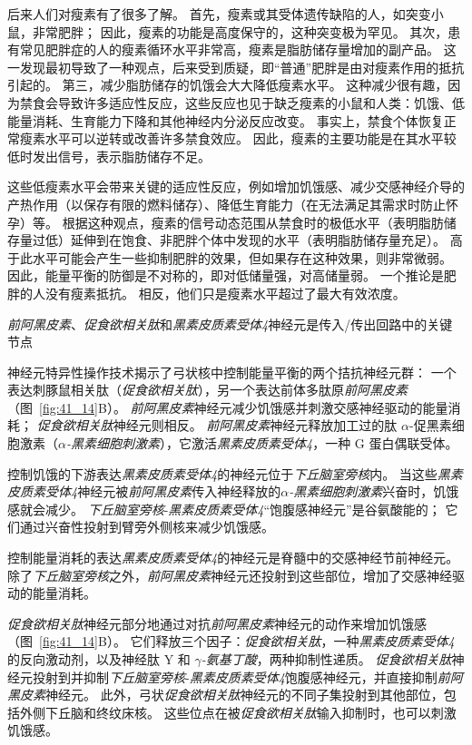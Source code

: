 后来人们对瘦素有了很多了解。
首先，瘦素或其受体遗传缺陷的人，如突变小鼠，非常肥胖；
因此，瘦素的功能是高度保守的，这种突变极为罕见。
其次，患有常见肥胖症的人的瘦素循环水平非常高，瘦素是脂肪储存量增加的副产品。
这一发现最初导致了一种观点，后来受到质疑，即“普通”肥胖是由对瘦素作用的抵抗引起的。
第三，减少脂肪储存的饥饿会大大降低瘦素水平。
这种减少很有趣，因为禁食会导致许多适应性反应，这些反应也见于缺乏瘦素的小鼠和人类：饥饿、低能量消耗、生育能力下降和其他神经内分泌反应改变。
事实上，禁食个体恢复正常瘦素水平可以逆转或改善许多禁食效应。
因此，瘦素的主要功能是在其水平较低时发出信号，表示脂肪储存不足。


这些低瘦素水平会带来关键的适应性反应，例如增加饥饿感、减少交感神经介导的产热作用（以保存有限的燃料储存）、降低生育能力（在无法满足其需求时防止怀孕）等。
根据这种观点，瘦素的信号动态范围从禁食时的极低水平（表明脂肪储存量过低）延伸到在饱食、非肥胖个体中发现的水平（表明脂肪储存量充足）。
高于此水平可能会产生一些抑制肥胖的效果，但如果存在这种效果，则非常微弱。
因此，能量平衡的防御是不对称的，即对低储量强，对高储量弱。
一个推论是肥胖的人没有瘦素抵抗。
相反，他们只是瘦素水平超过了最大有效浓度。


\textit{前阿黑皮素}、\textit{促食欲相关肽}和\textit{黑素皮质素受体4}神经元是传入/传出回路中的关键节点

神经元特异性操作技术揭示了弓状核中控制能量平衡的两个拮抗神经元群：
一个表达刺豚鼠相关肽（\textit{促食欲相关肽}），另一个表达前体多肽原\textit{前阿黑皮素}（图~\ref{fig:41_14}B）。
\textit{前阿黑皮素}神经元减少饥饿感并刺激交感神经驱动的能量消耗；
\textit{促食欲相关肽}神经元则相反。
\textit{前阿黑皮素}神经元释放加工过的肽 $\alpha$-促黑素细胞激素（\textit{$\alpha$-黑素细胞刺激素}），它激活\textit{黑素皮质素受体4}，一种 G 蛋白偶联受体。


控制饥饿的下游表达\textit{黑素皮质素受体4}的神经元位于\textit{下丘脑室旁核}内。
当这些\textit{黑素皮质素受体4}神经元被\textit{前阿黑皮素}传入神经释放的\textit{$\alpha$-黑素细胞刺激素}兴奋时，饥饿感就会减少。
\textit{下丘脑室旁核}-\textit{黑素皮质素受体4}“饱腹感神经元”是谷氨酸能的；
它们通过兴奋性投射到臂旁外侧核来减少饥饿感。


控制能量消耗的表达\textit{黑素皮质素受体4}的神经元是脊髓中的交感神经节前神经元。
除了\textit{下丘脑室旁核}之外，\textit{前阿黑皮素}神经元还投射到这些部位，增加了交感神经驱动的能量消耗。


\textit{促食欲相关肽}神经元部分地通过对抗\textit{前阿黑皮素}神经元的动作来增加饥饿感（图~\ref{fig:41_14}B）。
它们释放三个因子：\textit{促食欲相关肽}，一种\textit{黑素皮质素受体4}的反向激动剂，以及神经肽 Y 和 \textit{$ \gamma $-氨基丁酸}，两种抑制性递质。
\textit{促食欲相关肽}神经元投射到并抑制\textit{下丘脑室旁核}-\textit{黑素皮质素受体4}饱腹感神经元，并直接抑制\textit{前阿黑皮素}神经元。
此外，弓状\textit{促食欲相关肽}神经元的不同子集投射到其他部位，包括外侧下丘脑和终纹床核。
这些位点在被\textit{促食欲相关肽}输入抑制时，也可以刺激饥饿感。


